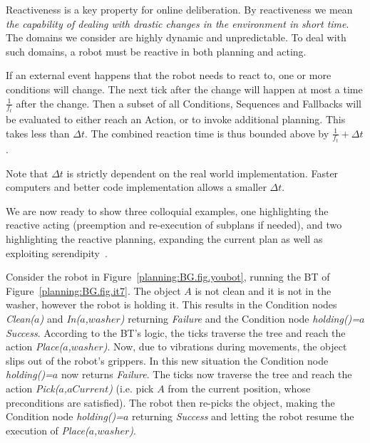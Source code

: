 Reactiveness is a key property for online deliberation. By reactiveness we mean \emph{the capability of dealing with drastic changes in the environment in short time}. The domains we consider are highly dynamic and unpredictable. To deal with such domains, a robot must be reactive in both planning and acting.



If an external event happens that the robot needs to react to, one or more conditions will change.
The next tick after the change will happen at most a time $\frac{1}{f_t}$ after the change. Then a subset of all
Conditions, Sequences and Fallbacks will be evaluated to either reach an Action,
or to invoke additional planning. This takes less than $\Delta t$.
The combined reaction time is thus bounded above by $\frac{1}{f_t}+\Delta t$.


\begin{remark}
Note that $\Delta t$ is strictly dependent on the real world implementation. Faster computers and better code implementation allows a smaller $\Delta t$.
\end{remark}


We are now ready to show three colloquial examples, one highlighting the reactive acting (preemption and re-execution of subplans if needed), and two highlighting the reactive planning, expanding the current plan as well as exploiting serendipity~\cite{levihn2013foresight}. 

\begin{example}
\label{planning:RE.ex.acting}
Consider the robot in Figure~\ref{planning:BG.fig.youbot}, running the BT of Figure~\ref{planning:BG.fig.it7}. The object $A$ is not clean and it is not in the washer, however the robot is holding it. This results in the Condition nodes \emph{Clean($a$)} and \emph{In($a$,$washer$)} returning  \emph{Failure} and the Condition node \emph{holding()=$a$}  \emph{Success}.  According to the BT's logic, the ticks traverse the tree and reach the action \emph{Place($a$,$washer$)}. Now, due to vibrations during movements, the object slips out of the robot's grippers. In this new situation the Condition node \emph{holding()=$a$} now returns  \emph{Failure}. The ticks now traverse the tree and reach the action \emph{Pick($a$,$aCurrent$)} (i.e. pick $A$ from the current position, whose preconditions are satisfied). The robot then re-picks the object, making the Condition node  \emph{holding()=$a$} returning  \emph{Success} and letting the robot resume the execution of \emph{Place($a$,$washer$)}.
\end{example}

